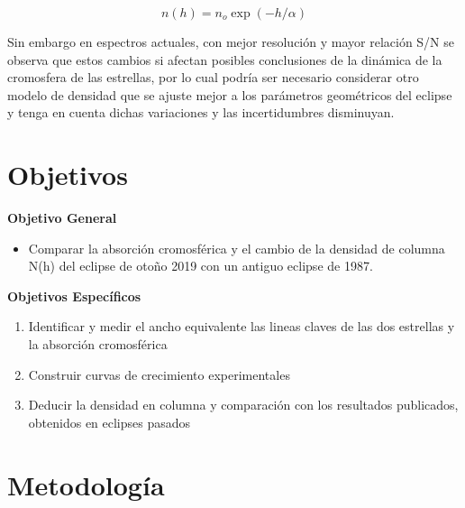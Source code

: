 \documentclass[11pt]{article}
\begin{document}
\begin{equation}
    n(h) = n_o \exp{(-h/\alpha)}
\end{equation}{}
\vspace{2mm}

Sin embargo en espectros actuales, con mejor resolución y mayor relación S/N se observa que estos cambios si afectan posibles conclusiones de la dinámica de la cromosfera de las estrellas, por lo cual podría ser necesario considerar otro modelo de densidad que se ajuste mejor a los parámetros geométricos del eclipse y tenga en cuenta dichas variaciones y las incertidumbres disminuyan.
\newpage
\section{Objetivos}

\textbf{Objetivo General}

\begin{itemize}
\item Comparar la absorción cromosférica y el cambio de la densidad de columna N(h) del eclipse de otoño 2019 con un antiguo eclipse de 1987.
\end{itemize}
\textbf{Objetivos Espec\'ificos}
\begin{enumerate}
    \item Identificar y medir el ancho equivalente las lineas claves de las dos estrellas y la  absorción cromosférica

    \item Construir curvas de crecimiento experimentales

    \item Deducir la densidad en columna y comparación 
con los resultados publicados, obtenidos en eclipses pasados
\end{enumerate}


\newpage


\section{Metodolog\'ia}
\end{document}
